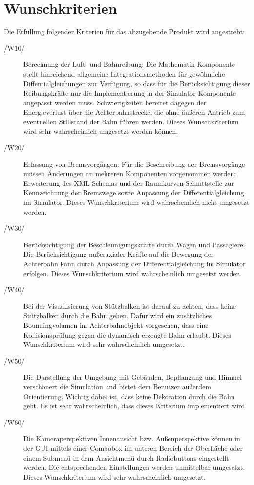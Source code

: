 \section{Wunschkriterien}

Die Erfüllung folgender Kriterien für das abzugebende Produkt wird angestrebt:
\begin{description}
	\item[/W10/] Berechnung der Luft- und Bahnreibung: Die Mathematik-Komponente stellt hinreichend allgemeine Integrationsmethoden für gewöhnliche Diffentialgleichungen zur Verfügung, so dass
		     für die Berücksichtigung dieser Reibungskräfte nur die Implementierung in der Simulator-Komponente angepasst werden muss. Schwierigkeiten bereitet dagegen der Energieverlust über
		     die Achterbahnstrecke, die ohne äußeren Antrieb zum eventuellen Stillstand der Bahn führen werden. Dieses Wunschkriterium wird sehr wahrscheinlich umgesetzt werden können.
	\item[/W20/] Erfassung von Bremsvorgängen: Für die Beschreibung der Bremsvorgänge müssen Änderungen an mehreren Komponenten vorgenommen werden: Erweiterung des XML-Schemas und
		     der Raumkurven-Schnittstelle zur Kennzeichnung der Bremswege sowie Anpassung der Differentialgleichung im Simulator. Dieses Wunschkriterium wird wahrscheinlich nicht umgesetzt werden.
	\item[/W30/] Berücksichtigung der Beschleunigungskräfte durch Wagen und Passagiere: Die Berücksichtigung außeraxialer Kräfte auf die Bewegung der Achterbahn kann durch Anpassung der
                     Differentialgleichung im Simulator erfolgen. Dieses Wunschkriterium wird wahrscheinlich umgesetzt werden.
	\item[/W40/] Bei der Visualisierung von Stützbalken ist darauf zu achten, dass keine Stützbalken durch die Bahn gehen. Dafür wird ein zusätzliches Boundingvolumen im Achterbahnobjekt vorgesehen, dass eine Kollisionsprüfung gegen die dynamisch erzeugte Bahn erlaubt. Dieses Wunschkriterium wird sehr wahrscheinlich umgesetzt.
	\item[/W50/] Die Darstellung der Umgebung mit Gebäuden, Bepflanzung und Himmel verschönert die Simulation und bietet dem Benutzer außerdem Orientierung. Wichtig dabei ist, dass keine Dekoration durch die Bahn geht. Es ist sehr wahrscheinlich, dass dieses Kriterium implementiert wird.
	\item[/W60/] Die Kameraperspektiven Innenansicht bzw. Außenperspektive können in der GUI mittels einer Combobox im unteren Bereich der Oberfläche oder einem Submenü in dem Ansichtmenü durch Radiobuttons eingestellt werden. Die entsprechenden Einstellungen werden unmittelbar umgesetzt. Dieses Wunschkriterium wird sehr wahrscheinlich umgesetzt.

\end{description}
